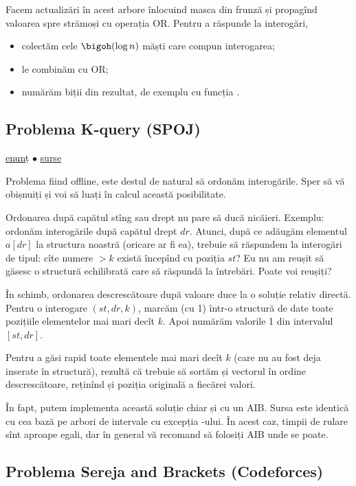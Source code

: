 Facem actualizări în acest arbore înlocuind masca din frunză și propagînd valoarea spre strămoși cu operația OR. Pentru a răspunde la interogări,

\begin{itemize}
  \item colectăm cele $\bigoh(\log n)$ măști care compun interogarea;
  \item le combinăm cu OR;
  \item numărăm biții din rezultat, de exemplu cu funcția .
\end{itemize}

\subsection{Problema K-query (SPOJ)}
\label{problem:k-query}

\href{https://www.spoj.com/problems/KQUERY/}{enunț}
$\bullet$
\hyperref[code:k-query]{surse}

Problema fiind offline, este destul de natural să ordonăm interogările. Sper să vă obișnuiți și voi să luați în calcul această posibilitate.

Ordonarea după capătul stîng sau drept nu pare să ducă nicăieri. Exemplu: ordonăm interogările după capătul drept $dr$. Atunci, după ce adăugăm elementul $a[dr]$ la structura noastră (oricare ar fi ea), trebuie să răspundem la interogări de tipul: cîte numere $> k$ există începînd cu poziția $st$? Eu nu am reușit să găsesc o structură echilibrată care să răspundă la întrebări. Poate voi reușiți?

În schimb, ordonarea descrescătoare după valoare duce la o soluție relativ directă. Pentru o interogare $(st, dr, k)$, marcăm (cu 1) într-o structură de date toate pozițiile elementelor mai mari decît $k$. Apoi numărăm valorile 1 din intervalul $[st, dr]$.

Pentru a găsi rapid toate elementele mai mari decît $k$ (care nu au fost deja inserate în structură), rezultă că trebuie să sortăm și vectorul în ordine descrescătoare, reținînd și poziția originală a fiecărei valori.

În fapt, putem implementa această soluție chiar și cu un AIB. Sursa este identică cu cea bază pe arbori de intervale cu excepția -ului. În acest caz, timpii de rulare sînt aproape egali, dar în general vă recomand să folosiți AIB unde se poate.

\subsection{Problema Sereja and Brackets (Codeforces)}
\label{problem:sereja-and-brackets}

